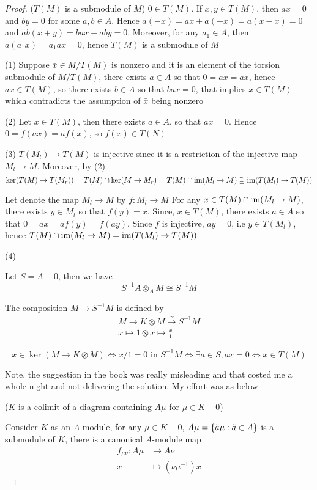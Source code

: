 \begin{proof}
	($T(M)$ is a submodule of $M$) $0 \in T(M)$. If $x, y \in T(M)$, then $ax = 0$ and $by = 0$ for some $a, b \in A$. Hence $a(-x) = ax + a(-x) = a(x - x) = 0$ and $ab(x+y) = bax + aby = 0$. Moreover, for any $a_1 \in A$, then $a(a_1 x) = a_1 ax = 0$, hence $T(M)$ is a submodule of $M$
	
	(1) Suppose $\bar{x} \in M / T(M)$ is nonzero and it is an element of the torsion submodule of $M / T(M)$, there exists $a \in A$ so that $0 = a \bar{x} = \overline{ax}$, hence $ax \in T(M)$, so there exists $b \in A$ so that $bax = 0$, that implies $x \in T(M)$ which contradicts the assumption of $\bar{x}$ being nonzero
	
	(2) Let $x \in T(M)$, then there exists $a \in A$, so that $ax = 0$. Hence $0 = f(ax) = a f(x)$, so $f(x) \in T(N)$
	
	(3) $T(M_l) \to T(M)$ is injective since it is a restriction of the injective map $M_l \to M$. Moreover, by (2)
	$$
		\ker (T(M) \to T(M_r)) = T(M) \cap \ker (M \to M_r) =  T(M) \cap \operatorname{im}(M_l \to M) \supseteq \operatorname{im}(T(M_l) \to T(M))
	$$
	
	Let denote the map $M_l \to M$ by $f: M_l \to M$
	For any $x \in T(M) \cap  \operatorname{im}(M_l \to M)$, there exists $y \in M_l$ so that $f(y) = x$. Since, $x \in T(M)$, there exists $a \in A$ so that $0 = ax = af(y) = f(ay)$. Since $f$ is injective, $ay = 0$, i.e $y \in T(M_l)$, hence $T(M) \cap \operatorname{im}(M_l \to M) = \operatorname{im}(T(M_l) \to T(M))$
	
	(4) 
	
	Let $S = A - 0$, then we have
	$$
		S^{-1} A \otimes_A M \cong S^{-1} M
	$$
	
	The composition $M \to S^{-1} M$ is defined by
	\begin{align*}
		M \to K \otimes M \xrightarrow{\sim} S^{-1}M \\
		x \mapsto 1 \otimes x \mapsto \frac{x}{1}
	\end{align*}

	$$
		x \in \ker (M \to K \otimes M) \iff x / 1 = 0 \text{ in } S^{-1} M \iff \exists a \in S, ax = 0 \iff x \in T(M)
	$$
	
	Note, the suggestion in the book was really misleading and that costed me a whole night and not delivering the solution. My effort was as below
	
	($K$ is a colimit of a diagram containing $A\mu$ for $\mu \in K - 0$)
	
	Consider $K$ as an $A$-module, for any $\mu \in K - 0$, $A \mu= \{\tilde{a} \mu: \tilde{a} \in A\}$ is a submodule of $K$, there is a canonical $A$-module map 
	\begin{align*}
		f_{\mu \nu}: A \mu &\to A \nu \\
		x &\mapsto (\nu \mu^{-1}) x
	\end{align*}
	

\end{proof}
